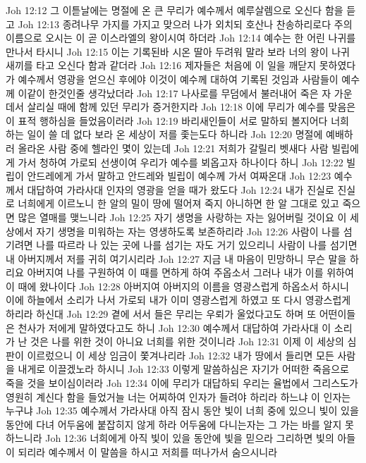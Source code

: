 Joh 12:12  그 이튿날에는 명절에 온 큰 무리가 예수께서 예루살렘으로 오신다 함을 듣고
Joh 12:13  종려나무 가지를 가지고 맞으러 나가 외치되 호산나 찬송하리로다 주의 이름으로 오시는 이 곧 이스라엘의 왕이시여 하더라
Joh 12:14  예수는 한 어린 나귀를 만나서 타시니
Joh 12:15  이는 기록된바 시온 딸아 두려워 말라 보라 너의 왕이 나귀 새끼를 타고 오신다 함과 같더라
Joh 12:16  제자들은 처음에 이 일을 깨닫지 못하였다가 예수께서 영광을 얻으신 후에야 이것이 예수께 대하여 기록된 것임과 사람들이 예수께 이같이 한것인줄 생각났더라
Joh 12:17  나사로를 무덤에서 불러내어 죽은 자 가운데서 살리실 때에 함께 있던 무리가 증거한지라
Joh 12:18  이에 무리가 예수를 맞음은 이 표적 행하심을 들었음이러라
Joh 12:19  바리새인들이 서로 말하되 볼지어다 너희 하는 일이 쓸 데 없다 보라 온 세상이 저를 좇는도다 하니라
Joh 12:20  명절에 예배하러 올라온 사람 중에 헬라인 몇이 있는데
Joh 12:21  저희가 갈릴리 벳새다 사람 빌립에게 가서 청하여 가로되 선생이여 우리가 예수를 뵈옵고자 하나이다 하니
Joh 12:22  빌립이 안드레에게 가서 말하고 안드레와 빌립이 예수께 가서 여짜온대
Joh 12:23  예수께서 대답하여 가라사대 인자의 영광을 얻을 때가 왔도다
Joh 12:24  내가 진실로 진실로 너희에게 이르노니 한 알의 밀이 땅에 떨어져 죽지 아니하면 한 알 그대로 있고 죽으면 많은 열매를 맺느니라
Joh 12:25  자기 생명을 사랑하는 자는 잃어버릴 것이요 이 세상에서 자기 생명을 미워하는 자는 영생하도록 보존하리라
Joh 12:26  사람이 나를 섬기려면 나를 따르라 나 있는 곳에 나를 섬기는 자도 거기 있으리니 사람이 나를 섬기면 내 아버지께서 저를 귀히 여기시리라
Joh 12:27  지금 내 마음이 민망하니 무슨 말을 하리요 아버지여 나를 구원하여 이 때를 면하게 하여 주옵소서 그러나 내가 이를 위하여 이 때에 왔나이다
Joh 12:28  아버지여 아버지의 이름을 영광스럽게 하옵소서 하시니 이에 하늘에서 소리가 나서 가로되 내가 이미 영광스럽게 하였고 또 다시 영광스럽게 하리라 하신대
Joh 12:29  곁에 서서 들은 무리는 우뢰가 울었다고도 하며 또 어떤이들은 천사가 저에게 말하였다고도 하니
Joh 12:30  예수께서 대답하여 가라사대 이 소리가 난 것은 나를 위한 것이 아니요 너희를 위한 것이니라
Joh 12:31  이제 이 세상의 심판이 이르렀으니 이 세상 임금이 쫓겨나리라
Joh 12:32  내가 땅에서 들리면 모든 사람을 내게로 이끌겠노라 하시니
Joh 12:33  이렇게 말씀하심은 자기가 어떠한 죽음으로 죽을 것을 보이심이러라
Joh 12:34  이에 무리가 대답하되 우리는 율법에서 그리스도가 영원히 계신다 함을 들었거늘 너는 어찌하여 인자가 들려야 하리라 하느냐 이 인자는 누구냐
Joh 12:35  예수께서 가라사대 아직 잠시 동안 빛이 너희 중에 있으니 빛이 있을 동안에 다녀 어두움에 붙잡히지 않게 하라 어두움에 다니는자는 그 가는 바를 알지 못하느니라
Joh 12:36  너희에게 아직 빛이 있을 동안에 빛을 믿으라 그리하면 빛의 아들이 되리라 예수께서 이 말씀을 하시고 저희를 떠나가서 숨으시니라
